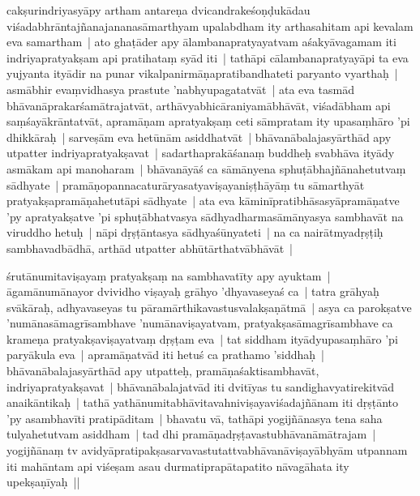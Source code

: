 \documentclass[article,12pt,a4paper]{memoir}%
\newcounter{parCount}
\begin{document}
	  
	  \pstart \leavevmode%
	\label{thakur75-19.31}cakṣurindriyasyāpy artham antareṇa dvicandrakeśoṇḍukādau viśadabhrāntajñanajananasāmarthyam upalabdham ity arthasahitam api kevalam eva samartham | ato ghaṭāder apy ālambanapratyayatvam aśakyāvagamam iti indriyapratyakṣam api pratihataṃ syād iti | tathāpi cālambanapratyayāpi ta eva yujyanta ityādir na punar vikalpanirmāṇapratibandhateti paryanto vyarthaḥ | asmābhir evaṃvidhasya prastute 'nabhyupagatatvāt | ata eva tasmād bhāvanāprakarśamātrajatvāt, arthāvyabhicāraniyamābhāvāt, viśadābham api saṃśayākrāntatvāt, apramāṇam apratyakṣaṃ ceti sāmpratam ity upasaṃhāro 'pi dhikkāraḥ | sarveṣām eva hetūnām asiddhatvāt | bhāvanābalajasyārthād apy utpatter indriyapratyakṣavat | sadarthaprakāśanaṃ buddheḥ svabhāva ityādy asmākam api manoharam | bhāvanāyāś ca sāmānyena sphuṭābhajñānahetutvaṃ sādhyate | pramāṇopannacaturāryasatyaviṣayaniṣṭhāyāṃ tu sāmarthyāt pratyakṣapramāṇahetutāpi sādhyate | ata eva kāminīpratibhāsasyāpramāṇatve 'py apratyakṣatve 'pi sphuṭābhatvasya sādhyadharmasāmānyasya sambhavāt na viruddho hetuḥ | nāpi dṛṣṭāntasya sādhyaśūnyateti | na ca nairātmyadṛṣṭiḥ sambhavadbādhā, arthād utpatter abhūtārthatvābhāvāt | 
	{}
	\pend%
      

	  
	  \pstart \leavevmode%
	\label{thakur75-20.11}śrutānumitaviṣayaṃ pratyakṣaṃ na sambhavatīty apy ayuktam | āgamānumānayor dvividho viṣayaḥ grāhyo 'dhyavaseyaś ca | tatra grāhyaḥ svākāraḥ, adhyavaseyas tu pāramārthikavastusvalakṣaṇātmā | asya ca parokṣatve 'numānasāmagrīsambhave 'numānaviṣayatvam, pratyakṣasāmagrīsambhave ca krameṇa pratyakṣaviṣayatvaṃ dṛṣṭam eva | tat siddham ityādyupasaṃhāro 'pi paryākula eva | apramāṇatvād iti hetuś ca prathamo 'siddhaḥ | bhāvanābalajasyārthād apy utpatteḥ, pramāṇaśaktisambhavāt, indriyapratyakṣavat | bhāvanābalajatvād iti dvitīyas tu sandighavyatirekitvād anaikāntikaḥ | tathā yathānumitabhāvitavahniviṣayaviśadajñānam iti dṛṣṭānto 'py asambhavīti pratipāditam | bhavatu vā, tathāpi yogijñānasya tena saha tulyahetutvam asiddham | tad dhi pramāṇadṛṣṭavastubhāvanāmātrajam | yogijñānaṃ tv avidyāpratipakṣasarvavastutattvabhāvanāviṣayābhyām utpannam iti mahāntam api viśeṣam asau durmatiprapātapatito nāvagāhata ity upekṣaṇīyaḥ || 
	{}
	\pend%
      
\end{document}
